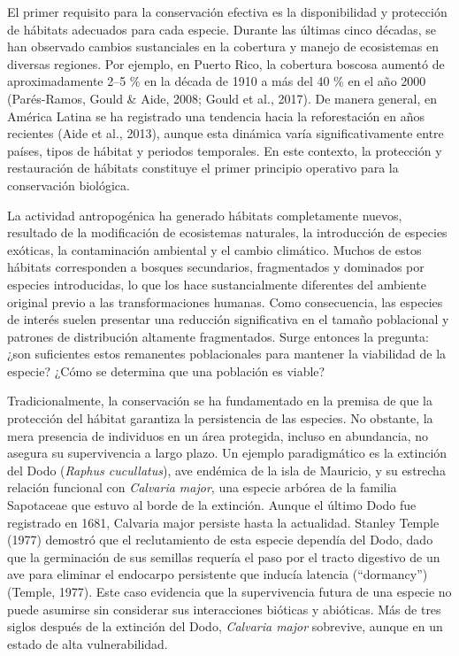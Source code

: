 \documentclass[
  12pt,
  letterpaper,
]{book}
\begin{document}
El primer requisito para la conservación efectiva es la disponibilidad y
protección de hábitats adecuados para cada especie. Durante las últimas
cinco décadas, se han observado cambios sustanciales en la cobertura y
manejo de ecosistemas en diversas regiones. Por ejemplo, en Puerto Rico,
la cobertura boscosa aumentó de aproximadamente 2--5 \% en la década de
1910 a más del 40 \% en el año 2000 (Parés-Ramos, Gould \& Aide, 2008;
Gould et al., 2017). De manera general, en América Latina se ha
registrado una tendencia hacia la reforestación en años recientes (Aide
et al., 2013), aunque esta dinámica varía significativamente entre
países, tipos de hábitat y periodos temporales. En este contexto, la
protección y restauración de hábitats constituye el primer principio
operativo para la conservación biológica.

La actividad antropogénica ha generado hábitats completamente nuevos,
resultado de la modificación de ecosistemas naturales, la introducción
de especies exóticas, la contaminación ambiental y el cambio climático.
Muchos de estos hábitats corresponden a bosques secundarios,
fragmentados y dominados por especies introducidas, lo que los hace
sustancialmente diferentes del ambiente original previo a las
transformaciones humanas. Como consecuencia, las especies de interés
suelen presentar una reducción significativa en el tamaño poblacional y
patrones de distribución altamente fragmentados. Surge entonces la
pregunta: ¿son suficientes estos remanentes poblacionales para mantener
la viabilidad de la especie? ¿Cómo se determina que una población es
viable?

Tradicionalmente, la conservación se ha fundamentado en la premisa de
que la protección del hábitat garantiza la persistencia de las especies.
No obstante, la mera presencia de individuos en un área protegida,
incluso en abundancia, no asegura su supervivencia a largo plazo. Un
ejemplo paradigmático es la extinción del Dodo (\emph{Raphus
cucullatus}), ave endémica de la isla de Mauricio, y su estrecha
relación funcional con \emph{Calvaria major}, una especie arbórea de la
familia Sapotaceae que estuvo al borde de la extinción. Aunque el último
Dodo fue registrado en 1681, Calvaria major persiste hasta la
actualidad. Stanley Temple (1977) demostró que el reclutamiento de esta
especie dependía del Dodo, dado que la germinación de sus semillas
requería el paso por el tracto digestivo de un ave para eliminar el
endocarpo persistente que inducía latencia (``dormancy'') (Temple,
1977). Este caso evidencia que la supervivencia futura de una especie no
puede asumirse sin considerar sus interacciones bióticas y abióticas.
Más de tres siglos después de la extinción del Dodo, \emph{Calvaria
major} sobrevive, aunque en un estado de alta vulnerabilidad.
\end{document}
